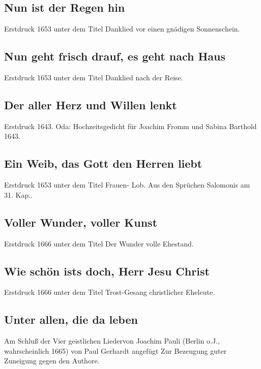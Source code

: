\subsection*{ Nun ist der Regen hin}

Erstdruck 1653 unter dem Titel \frqq Danklied vor einen gnädigen
Sonnenschein\flqq .

\subsection*{ Nun geht frisch drauf, es geht nach Haus}

Erstdruck 1653 unter dem Titel \frqq Danklied nach der Reise\flqq .

\subsection*{ Der aller Herz und Willen lenkt}

Erstdruck 1643. \frqq Oda: Hochzeitsgedicht für Joachim Fromm und Sabina
Barthold 1643\flqq .

\subsection*{ Ein Weib, das Gott den Herren liebt}

Erstdruck 1653 unter dem Titel \frqq Frauen- Lob. Aus den Sprüchen Salomonis
am 31. Kap.\flqq .

\subsection*{ Voller Wunder, voller Kunst}

Erstdruck 1666 unter dem Titel \frqq Der Wunder volle Ehestand\flqq .

\subsection*{ Wie schön ists doch, Herr Jesu Christ}

Erstdruck 1666 unter dem Titel \frqq Trost-Gesang christlicher Eheleute\flqq .

\subsection*{ Unter allen, die da leben}

Am Schluß der \frqq Vier geistlichen Lieder\flqq  von Joachim Pauli (Berlin o.J.,
wahrscheinlich 1665) von Paul Gerhardt angefügt \frqq Zur Bezeugung guter
Zuneigung gegen den Authore\flqq .

